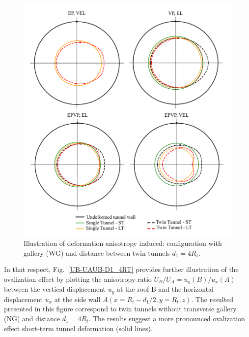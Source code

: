 \documentclass[a4paper,fleqn]{cas-sc}
\begin{document}
\begin{figure}[h!]
	\centering
	\includegraphics[scale=0.4]{ovalization.pdf}
	\caption{Illustration of deformation anisotropy induced: configuration with gallery (WG) and distance between twin tunnels $d_1 = 4R_t$.}
	\label{ovalization}
\end{figure}
\FloatBarrier

In that respect, Fig.~\ref{UB-UAUB-D1_4RT} provides further illustration of the ovalization effect by plotting the anisotropy ratio $U_B/U_A = u_y(B)/u_x(A)$ between the vertical displacement $u_y$ at the roof B and the horizontal displacement $u_x$ at the side wall $A(x=R_t - d_1/2,y=R_t,z)$. The resulted presented in this figure correspond to twin tunnels without transverse gallery (NG) and distance $d_1=4R_t$. The results suggest a more pronounced ovalization effect short-term tunnel deformation (solid lines).
\end{document}
